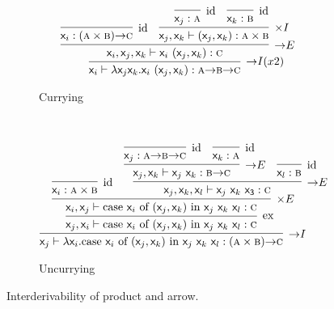 \begin{figure}
	\centering
	\begin{subfigure}{1\textwidth}
		\[
		\infer[\ii I (x2)]{\vari \vdash \lam \varj\vark.\vari~(\varj, \vark): \prop{a} \ii \prop{b} \ii \prop{c}}{
			\infer[\ii E]{\vari, \varj, \vark \vdash \vari~(\varj, \vark): \prop{c}}{
				\infer[\Ax]{\vari: (\prop{a} \times \prop{b}) \ii \prop{c}}{}
				&
				\infer[\times I]{\varj, \vark \vdash (\varj, \vark): \prop{a} \times \prop{b}}{
					\infer[\Ax]{\varj: \prop{a}}{}
					&			
					\infer[\Ax]{\vark: \prop{b}}{}
				}
			}
		}
		\]
		\caption{Currying}
		\label{subfigure:currying}
	\end{subfigure}\\[\midsep]
	\begin{subfigure}{1\textwidth}
		\[
			\infer[\ii I]{\varj \vdash \term{\lam \vari.}\caseof{\vari}{(\varj,\vark)}{\varj~\vark~\varl}:(\prop{a} \times \prop{b})\ii \prop{c}}{
				\infer[\Exchange{}]{\varj, \vari  \vdash \caseof{\vari}{(\varj,\vark)}{\varj~\vark~\varl}:\prop{c}}{
					\infer[\times E]{\vari, \varj \vdash \caseof{\vari}{(\varj,\vark)}{\varj~\vark~\varl}:\prop{c}}{
						\infer[\Ax]{\vari: \prop{a} \times \prop{b}}{}
						&
						\infer[\ii E]{\varj, \vark, \varl \vdash \term{\varj~\vark~x_3}: \prop{c}}{
							\infer[\ii E]{\varj, \vark \vdash \term{\varj~\vark}: \prop{b} \ii \prop{c}}{
								\infer[\Ax]{\varj: \prop{a} \ii \prop{b} \ii \prop{c}}{}
								&
								\infer[\Ax]{\vark: \prop{a}}{}
							}
							&
							\infer[\Ax]{\varl: \prop{b}}{}
						}
					}
				}
			}
		\]
		\caption{Uncurrying}
		\label{subfigure:uncurrying}
	\end{subfigure}
	\caption{Interderivability of product and arrow.}
	\label{figure:curry_uncurry}
\end{figure}

